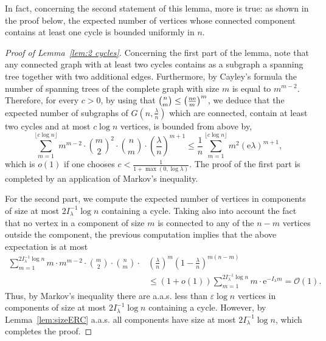 \documentclass[AHL,Unicode,longabstracts,published]{cedram}
\newcommand{\e}{\mathrm{e}}
\newcommand{\cO}{\mathcal{O}}
\begin{document}
\begin{rema}
In fact, concerning the second statement of this lemma, more is true: as shown in the proof below, the expected number of vertices whose connected component contains at least one cycle is bounded uniformly in $n$.
\end{rema}
\begin{proof}[Proof of Lemma~\ref{lem:2 cycles}]
Concerning the first part of the lemma, note that any connected graph with at least two cycles contains as a subgraph a spanning tree together with two additional edges. Furthermore, by Cayley's formula the number of spanning trees of the complete graph with size $m$ is equal to $m^{m-2}$. Therefore, for every $c>0$, by using that $\tbinom{n}{m}\le \left(\tfrac{n\e}{m}\right)^m$, we deduce that the expected number of subgraphs of $G(n,\tfrac{\lambda}{n})$ which are connected, contain at least two cycles and at most $c\log n$ vertices, is bounded from above by,
\begin{equation*}
\sum_{m=1}^{\lfloor c\log n\rfloor} m^{m-2}\cdot \binom{m}{2}^2\cdot \binom{n}{m}\cdot \left(\frac{\lambda}{n}\right)^{m+1} \le \frac{1}{n}\sum_{m=1}^{\lfloor c\log n\rfloor} m^2 (\e\lambda)^{m+1},
\end{equation*}
which is $o(1)$ if one chooses $c<\frac{1}{1+\max(0,\log \lambda)}$. The proof of the first part is completed by an application of Markov's inequality.

For the second part, we compute the expected number of vertices in components of size at most $2 I_{\lambda}^{-1} \log n$ containing a cycle. Taking also into account the fact that no vertex in a component of size $m$ is connected to any of the $n-m$ vertices outside the component, the previous computation implies that the above expectation is at most
\begin{align*}
\sum_{m=1}^{2 I_{\lambda}^{-1} \log n} m\cdot m^{m-2}\cdot \binom{m}{2}\cdot \binom{n}{m} \cdot &\left(\frac{\lambda}{n}\right)^m \left(1-\frac{\lambda}{n}\right)^{m(n-m)}\\
&\le (1+o(1))\sum_{m=1}^{2 I_{\lambda}^{-1} \log n} m\cdot \e^{-I_{\lambda} m}= \cO(1).
\end{align*}
Thus, by Markov's inequality there are a.a.s. less than $\varepsilon \log n$ vertices in components of size at most $2 I_{\lambda}^{-1} \log n$ containing a cycle. However, by Lemma~\ref{lem:sizeERC} a.a.s. all components have size at most $2 I_{\lambda}^{-1} \log n$, which completes the proof.
\end{proof}
\end{document}
